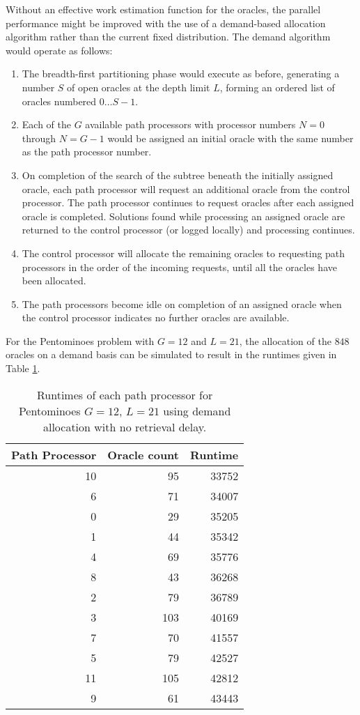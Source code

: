 Without an effective work estimation function for the oracles, the parallel
performance might be improved with the use of a demand-based allocation algorithm
rather than the current fixed distribution.  The demand algorithm would operate as
follows:
\begin{enumerate}
\item{The breadth-first partitioning phase would execute as before, generating
  a number $S$ of open oracles at the depth limit $L$, forming an ordered list of
  oracles numbered $0\ldots S-1$.}
\item{Each of the $G$ available path processors with processor numbers $N=0$ through $N=G-1$ would
  be assigned an initial oracle with the same number as the path processor number.}
\item{On completion of the search of the subtree beneath the initially assigned oracle, each
  path processor will request an additional oracle from the control processor.  The path
  processor continues to request oracles after each assigned oracle is completed.
  Solutions found while processing an assigned oracle are returned to the control processor
  (or logged locally) and processing continues.}
\item{The control processor will allocate the remaining oracles to requesting path processors in
  the order of the incoming requests, until all the oracles have been allocated.}
\item{The path processors become idle on completion of an assigned oracle when the control
  processor indicates no further oracles are available.}
\end{enumerate}

For the Pentominoes problem with $G=12$ and $L=21$, the allocation of the $848$ oracles on
a demand basis can be simulated to result in the runtimes given in Table \ref{pent_demand0}.

\begin{table}[htb]
{\small
\begin{tabular}{| r | r | r |}
\hline
\textbf{Path Processor} & \textbf{Oracle count} & \textbf{Runtime} \\
\hline
10 & 95  & 33752 \\
6  & 71  & 34007 \\
0  & 29  & 35205 \\
1  & 44  & 35342 \\
4  & 69  & 35776 \\
8  & 43  & 36268 \\
2  & 79  & 36789 \\
3  & 103 & 40169 \\
7  & 70  & 41557 \\
5  & 79  & 42527 \\
11 & 105 & 42812 \\
9  & 61  & 43443 \\
\hline
\end{tabular}
}
\caption{Runtimes of each path processor for Pentominoes $G=12$, $L=21$ using demand allocation
  with no retrieval delay.}
\label{pent_demand0}
\end{table}

